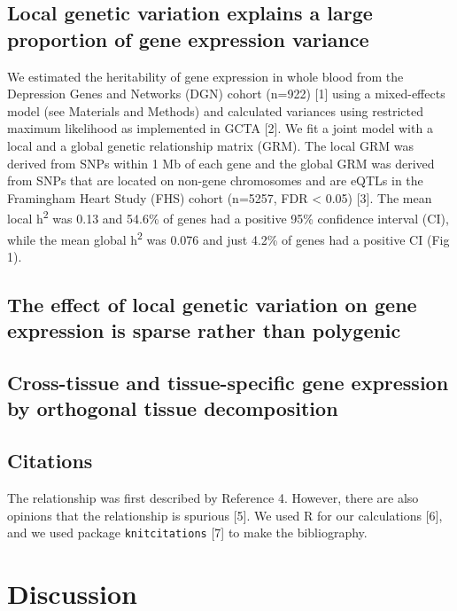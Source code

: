 \documentclass[]{article}
\begin{document}
\subsection{Local genetic variation explains a large proportion of gene
expression
variance}\label{local-genetic-variation-explains-a-large-proportion-of-gene-expression-variance}

We estimated the heritability of gene expression in whole blood from the
Depression Genes and Networks (DGN) cohort (n=922) {[}1{]} using a
mixed-effects model (see Materials and Methods) and calculated variances
using restricted maximum likelihood as implemented in GCTA {[}2{]}. We
fit a joint model with a local and a global genetic relationship matrix
(GRM). The local GRM was derived from SNPs within 1 Mb of each gene and
the global GRM was derived from SNPs that are located on non-gene
chromosomes and are eQTLs in the Framingham Heart Study (FHS) cohort
(n=5257, FDR \textless{} 0.05) {[}3{]}. The mean local
h\textsuperscript{2} was 0.13 and 54.6\% of genes had a positive 95\%
confidence interval (CI), while the mean global h\textsuperscript{2} was
0.076 and just 4.2\% of genes had a positive CI (Fig 1).

\subsection{The effect of local genetic variation on gene expression is
sparse rather than
polygenic}\label{the-effect-of-local-genetic-variation-on-gene-expression-is-sparse-rather-than-polygenic}

\subsection{Cross-tissue and tissue-specific gene expression by
orthogonal tissue
decomposition}\label{cross-tissue-and-tissue-specific-gene-expression-by-orthogonal-tissue-decomposition}

\subsection{Citations}\label{citations}

The relationship was first described by Reference 4. However, there are
also opinions that the relationship is spurious {[}5{]}. We used R for
our calculations {[}6{]}, and we used package \texttt{knitcitations}
{[}7{]} to make the bibliography.

\section{Discussion}\label{discussion}
\end{document}

